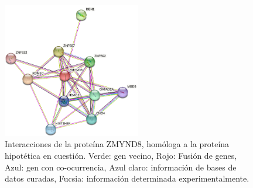 \documentclass[journal,transmag]{IEEEtran}
\begin{document}
\begin{figure}[!h]
	\center
	\includegraphics[width=6cm]{imagenes/interaccion.png}
	\caption{Interacciones de la proteína ZMYND8, homóloga a la proteína hipotética en cuestión. Verde: gen vecino, Rojo: Fusión de genes, Azul: gen con co-ocurrencia, Azul claro: información de bases de datos curadas, Fucsia: información determinada experimentalmente. }
	\label{18}
\end{figure}
\end{document}
